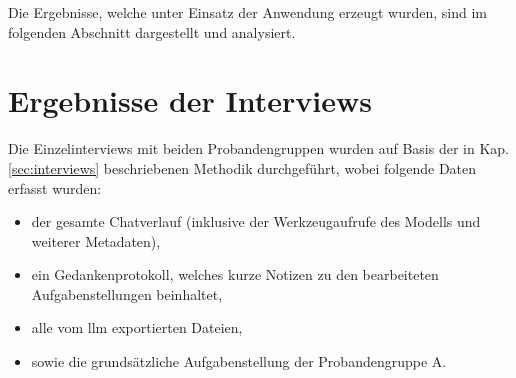 Die Ergebnisse, welche unter Einsatz der Anwendung erzeugt wurden, sind im folgenden Abschnitt dargestellt und analysiert.

\section{Ergebnisse der Interviews}
\label{sec:results-interviews}

Die Einzelinterviews mit beiden Probandengruppen wurden auf Basis der in Kap. \ref{sec:interviews} beschriebenen Methodik durchgeführt, wobei folgende Daten erfasst wurden:

\begin{itemize}
  \item der gesamte Chatverlauf (inklusive der Werkzeugaufrufe des Modells und weiterer Metadaten),
  \item ein Gedankenprotokoll, welches kurze Notizen zu den bearbeiteten Aufgabenstellungen beinhaltet,
  \item alle vom \gls{llm} exportierten Dateien,
  \item sowie die grundsätzliche Aufgabenstellung der Probandengruppe A.
\end{itemize}

